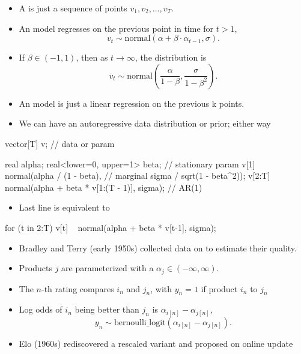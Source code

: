 \documentclass[10pt]{report}
\begin{document}
\begin{itemize}
\item A  is just a sequence of points $v_1, v_2, \ldots, v_T$.
\item An  model regresses on the previous point in time for $t > 1$,
  $$
  v_t \sim \textrm{normal}(\alpha + \beta \cdot \alpha_{t-1}, \sigma).
  $$
\item If $\beta \in (-1, 1)$, then as $t \rightarrow \infty$, the  distribution is
$$
  v_t \sim \textrm{normal}\!\left(\frac{\alpha}{1 - \beta}, \frac{\sigma}{1 - \beta^2}\right).
  $$
\item An  model is just a linear regression on the previous k points.
\end{itemize}

\begin{itemize}
\item We can have an autoregressive data distribution or prior; either way
\end{itemize}
\begin{stancode}
vector[T] v;                                          // data or param
  
real alpha; real<lower=0, upper=1> beta;              // stationary param
v[1] ~ normal(alpha / (1 - beta),                     // marginal
              sigma / sqrt(1 - beta^2));              
v[2:T] ~ normal(alpha + beta * v[1:(T - 1)], sigma);  // AR(1)
\end{stancode}
\begin{itemize}
\item Last line is equivalent to
\end{itemize}
\begin{stancode}
for (t in 2:T)
  v[t] ~ normal(alpha + beta * v[t-1], sigma); 
\end{stancode}



\begin{itemize}
\item Bradley and Terry (early 1950s) collected data on   to estimate their quality. 
\item Products $j$ are parameterized with a 
  $\alpha_j \in (-\infty, \infty)$.
\item The $n$-th rating compares  $i_n$ and $j_n$, with  $y_n = 1$ if product $i_n$  to $j_n$
\item Log odds of $i_n$ being better than $j_n$ is $\alpha_{i[n]} - \alpha_{j[n]}$,
  $$
  y_n \sim \textrm{bernoulli\_logit}(\alpha_{i[n]} - \alpha_{j[n]}).
  $$
\item Elo (1960s) rediscovered a rescaled variant and proposed on online update
\end{itemize}
\end{document}
